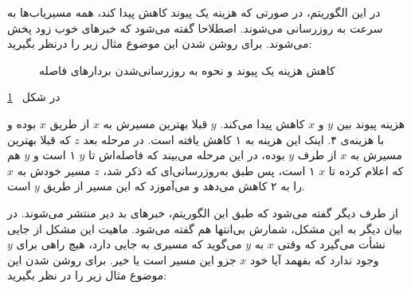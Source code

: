   در این الگوریتم، در صورتی که هزینه یک پیوند کاهش پیدا کند، همه مسیریاب‌ها به سرعت به روزرسانی می‌شوند. اصطلاحا گفته می‌شود که خبرهای خوب زود پخش می‌شوند. برای روشن شدن این موضوع مثال زیر را درنظر بگیرید:
  

 \begin{figure}[H]
\centering
{}
\caption{کاهش هزینه یک پیوند و نحوه به روزرسانی‌شدن بردار‌های فاصله}
\label{fig:goodnews}
\end{figure}
 

 در شکل 
 ~\ref{fig:goodnews}

 هزینه پیوند بین $y$ و $x$ کاهش پیدا می‌کند. $y$ قبلا بهترین مسیرش به $x$ از طریق $x$ بوده و با هزینه‌ی ۴. اینک این هزینه به ۱ کاهش یافته است. در مرحله بعد $z$ که قبلا بهترین مسیرش به $x$ از طرف $y$ بوده، در این مرحله می‌بیند که فاصله‌اش تا $y$ ۱ است و $y$ هم که اعلام کرده تا $x$ ۱ است، پس طبق به‌روزرسانی‌ای که ذکر شد، $z$  مسیر خودش به $x$ را به ۲ کاهش می‌دهد و می‌آموزد که این مسیر از طریق $y$ است. 
 
 از طرف دیگر گفته می‌شود که طبق این الگوریتم، خبرهای بد دیر منتشر می‌شوند. در بیان دیگر به این مشکل، شمارش بی‌انتها هم گفته می‌شود. ماهیت این مشکل از جایی نشأت می‌گیرد که وقتی $x$ به $y$ می‌گوید که مسیری به جایی دارد، هیچ راهی برای $y$ وجود ندارد که بفهمد آیا خود $x$ جزو این مسیر است یا خیر. برای روشن شدن این موضوع مثال زیر را در نظر بگیرید: 
 
